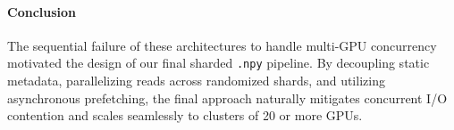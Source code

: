 \paragraph{Conclusion}
The sequential failure of these architectures to handle multi-GPU concurrency motivated the design of our final sharded \texttt{.npy} pipeline. By decoupling static metadata, parallelizing reads across randomized shards, and utilizing asynchronous prefetching, the final approach naturally mitigates concurrent I/O contention and scales seamlessly to clusters of 20 or more GPUs.